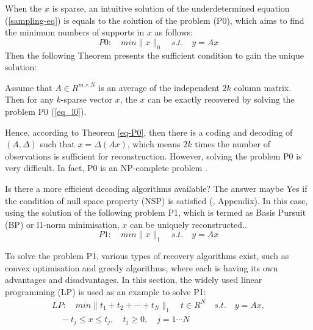 When the $x$ is sparse, an intuitive solution of the underdetermined equation (\ref{sampling-eq}) is equals to the solution of the problem (P0), which aims to find the minimum numbers of supports in $x$ as follows:
\begin{equation}
\label{eq_l0}
P0: \quad min \| x \|_0 \quad s.t. \quad y = Ax
\end{equation}
Then the following Theorem presents the sufficient condition to gain the unique solution:
\begin{theorem}
\label{eq-P0}
Assume that $A \in R^{m \times N}$ is an average of the independent $2k$ column matrix. Then for any $k$-sparse vector $x$, the $x$ can be exactly recovered by solving the problem P0 (\ref{eq_l0}).
\end{theorem}

Hence, according to Theorem \ref{eq-P0}, then there is a coding and decoding of $(A, \Delta)$ such that $x = \Delta(Ax)$, which means $2k$ times the number of observations is sufficient for reconstruction. However, solving the problem P0 is very difficult. In fact, P0 is an NP-complete problem \cite{davis1997adaptive}.

Is there a more efficient decoding algorithms available? The answer maybe Yes if the condition of null space property (NSP) is satisfied (\cite{devore2007deterministic}, Appendix). In this case, using the solution of the following problem P1, which is termed as Basis Pursuit (BP) or l1-norm minimisation, $x$ can be uniquely reconstructed..
\begin{equation}
\label{eq_l1}
P1: \quad min \| x \|_1 \quad s.t. \quad y = Ax
\end{equation}

To solve the problem P1, various types of recovery algorithms exist, such as  convex optimisation and greedy algorithms, where each is having its own advantages and disadvantages. In this section, the widely used linear programming (LP) is used as an example to solve P1:
\begin{equation}
\begin{split}
LP: \quad min \| t_1 + t_2 + \cdots + t_N \|_1 \quad t \in R^N\quad s.t. \quad y = Ax, \\
\quad -t_j \leq x \leq t_j, \quad t_j \geq 0, \quad j = 1 \cdots N
\end{split}
\end{equation}


